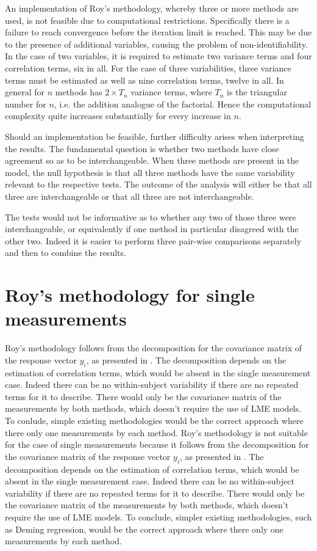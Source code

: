 \documentclass[12pt, a4paper]{report}
\theoremstyle{plain}
\theoremstyle{definition}
\theoremstyle{remark}
\begin{document}
An implementation of Roy's methodology, whereby three or more methods are used, is not feasible due to computational restrictions. Specifically there is a failure to reach convergence before the iteration limit is reached. This may be due to the presence of additional variables, causing the problem of non-identifiability. In the case of two variables, it is required to estimate two variance terms and four correlation terms, six in all. For the case of three variabilities, three variance terms must be estimated as well as nine correlation terms, twelve in all. In general for $n$ methods has $2 \times T_{n}$ variance terms, where $T_n$ is the triangular number for $n$, i.e. the addition analogue of the factorial. Hence the computational complexity quite increases substantially for every increase in $n$.

Should an implementation be feasible, further difficulty arises when interpreting the results. The fundamental question is whether two methods have close agreement so as to be interchangeable. When three methods are present in the model, the null hypothesis is that all three methods have the same variability relevant to the respective tests. The outcome of the analysis will either be that all three are interchangeable or that all three are not interchangeable.

The tests would not be informative as to whether any two of those three were interchangeable, or equivalently if one method in particular disagreed with the other two. Indeed it is easier to perform three pair-wise comparisons separately and then to combine the results.




\section{Roy's methodology for single measurements}
Roy's methodology follows from the decomposition for the covariance matrix of the response vector $y_{i}$, as presented in \citet{hamlett}. The decomposition depends on the estimation of correlation terms, which would be absent in the single measurement case. Indeed there can be no within-subject variability if there are no repeated terms for it to describe. There would only be the covariance matrix of the measurements by both methods, which doesn't require the use of LME models. To conlude, simple existing methodologies would be the correct approach where there only one measurements by each method.
Roy's methodology is not suitable for the case of single measurements because it follows from the decomposition for the covariance matrix of the response vector $y_{i}$, as presented in \citet{hamlett}. The decomposition depends on the estimation of correlation terms, which would be absent in the single measurement case. Indeed there can be no within-subject variability if there are no repeated terms for it to describe. There would only be the covariance matrix of the measurements by both methods, which doesn't require the use of LME models. To conclude, simpler existing methodologies, such as Deming regression, would be the correct approach where there only one measurements by each method.
\end{document}
